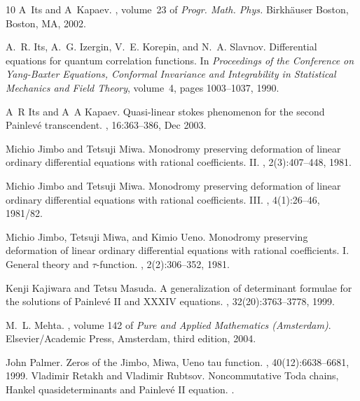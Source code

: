 \documentclass{article}
\begin{document}
\begin{thebibliography}{10}
A~Its and A~Kapaev.
, volume~23 of {\em Progr. Math. Phys.}
\newblock Birkh\"auser Boston, Boston, MA, 2002.

A.~R. Its, A.~G. Izergin, V.~E. Korepin, and N.~A. Slavnov.
\newblock Differential equations for quantum correlation functions.
\newblock In {\em Proceedings of the {C}onference on {Y}ang-{B}axter
  {E}quations, {C}onformal {I}nvariance and {I}ntegrability in {S}tatistical
  {M}echanics and {F}ield {T}heory}, volume~4, pages 1003--1037, 1990.

A~R Its and A~A Kapaev.
\newblock Quasi-linear stokes phenomenon for the second Painlev{\'e}
  transcendent.
, 16:363--386, Dec 2003.

Michio Jimbo and Tetsuji Miwa.
\newblock Monodromy preserving deformation of linear ordinary differential
  equations with rational coefficients. {II}.
, 2(3):407--448, 1981.

Michio Jimbo and Tetsuji Miwa.
\newblock Monodromy preserving deformation of linear ordinary differential
  equations with rational coefficients. {III}.
, 4(1):26--46, 1981/82.

Michio Jimbo, Tetsuji Miwa, and Kimio Ueno.
\newblock Monodromy preserving deformation of linear ordinary differential
  equations with rational coefficients. {I}. {G}eneral theory and {$\tau
  $}-function.
, 2(2):306--352, 1981.

Kenji Kajiwara and Tetsu Masuda.
\newblock A generalization of determinant formulae for the solutions of
  {P}ainlev{\'e} {II} and {XXXIV} equations.
, 32(20):3763--3778, 1999.

M.~L. Mehta.
, volume 142 of {\em Pure and Applied
  Mathematics (Amsterdam)}.
\newblock Elsevier/Academic Press, Amsterdam, third edition, 2004.

John Palmer.
\newblock Zeros of the {J}imbo, {M}iwa, {U}eno tau function.
, 40(12):6638--6681, 1999.
Vladimir Retakh and Vladimir Rubtsov.
\newblock Noncommutative Toda chains, Hankel quasideterminants and Painlev\'e II
  equation.
.


\end{thebibliography}
\end{document}
